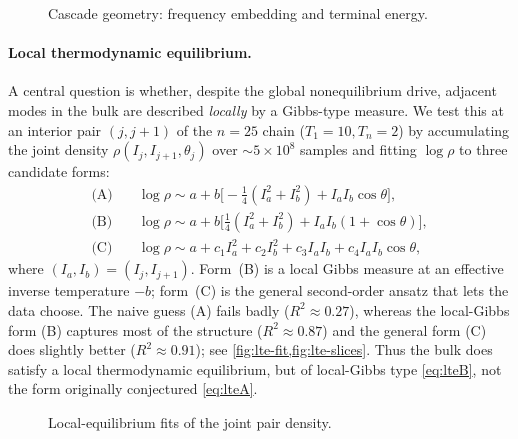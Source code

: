 \documentclass[11pt,a4paper]{article}
\theoremstyle{definition}
\numberwithin{equation}{section}   %
\begin{document}
\begin{figure}[ht]
  \centering
  \caption{Cascade geometry: frequency embedding and terminal energy.}
  \label{fig:embedding}
\end{figure}

\paragraph{Local thermodynamic equilibrium.}\label{par:lte}
A central question is whether, despite the global nonequilibrium drive, adjacent
modes in the bulk are described \emph{locally} by a Gibbs-type measure. We test
this at an interior pair $(j,j+1)$ of the $n=25$ chain ($T_1=10,T_n=2$) by
accumulating the joint density $\rho(I_j,I_{j+1},\theta_j)$ over $\sim5\times
10^{8}$ samples and fitting $\log\rho$ to three candidate forms:
\begin{align}
  \text{(A)}\quad &\log\rho \sim a + b\big[-\tfrac14(I_a^2+I_b^2)+I_a I_b\cos\theta\big],
  \label{eq:lteA}\\
  \text{(B)}\quad &\log\rho \sim a + b\big[\tfrac14(I_a^2+I_b^2)+I_a I_b(1+\cos\theta)\big],
  \label{eq:lteB}\\
  \text{(C)}\quad &\log\rho \sim a + c_1 I_a^2 + c_2 I_b^2 + c_3 I_a I_b + c_4 I_a I_b\cos\theta,
  \label{eq:lteC}
\end{align}
where $(I_a,I_b)=(I_j,I_{j+1})$. Form~(B) is a local Gibbs measure at an
effective inverse temperature $-b$; form~(C) is the general second-order ansatz
that lets the data choose. The naive guess (A) fails badly
($R^2\approx0.27$), whereas the local-Gibbs form (B) captures most of the
structure ($R^2\approx0.87$) and the general form (C) does slightly better
($R^2\approx0.91$); see \cref{fig:lte-fit,fig:lte-slices}. Thus the bulk does
satisfy a local thermodynamic equilibrium, but of local-Gibbs type
\eqref{eq:lteB}, not the form originally conjectured \eqref{eq:lteA}.

\begin{figure}[ht]
  \centering
  \caption{Local-equilibrium fits of the joint pair density.}
  \label{fig:lte-fit}
\end{figure}
\end{document}
